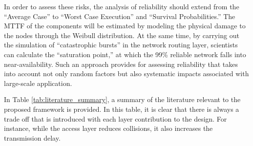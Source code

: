 \documentclass[a4paper,fleqn]{cas-dc}
\numberwithin{equation}{section}
\begin{document}
In order to assess these risks, the analysis of reliability should extend from the “Average Case” to “Worst Case Execution” and “Survival Probabilities.” The MTTF of the components will be estimated by modeling the physical damage to the nodes through the Weibull distribution. At the same time, by carrying out the simulation of “catastrophic bursts” in the network routing layer, scientists can calculate the “saturation point,” at which the 99\% reliable network falls into near-availability. Such an approach provides for assessing reliability that takes into account not only random factors but also systematic impacts associated with large-scale application.

In Table \ref{tab:literature_summary}, a summary of the literature relevant to the proposed framework is provided. In this table, it is clear that there is always a trade off that is introduced with each layer contribution to the design. For instance, while the access layer reduces collisions, it also increases the transmission delay.
\end{document}

